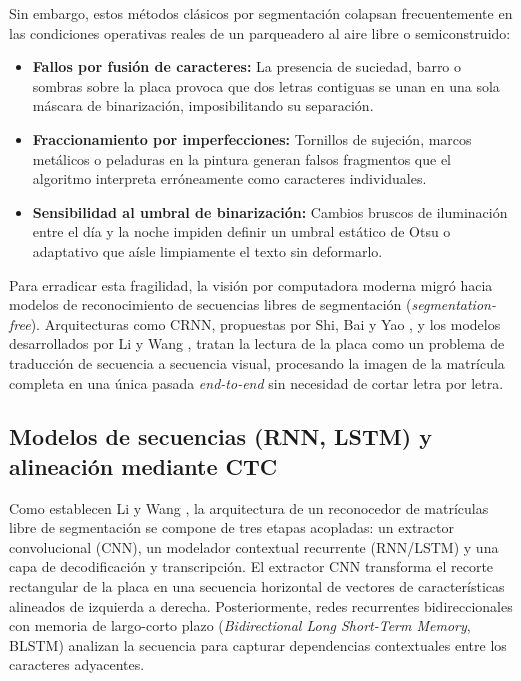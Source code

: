 Sin embargo, estos métodos clásicos por segmentación colapsan frecuentemente en
las condiciones operativas reales de un parqueadero al aire libre o
semiconstruido:
\begin{itemize}
    \item \textbf{Fallos por fusión de caracteres:} La presencia de suciedad,
        barro o sombras sobre la placa provoca que dos letras contiguas se unan
        en una sola máscara de binarización, imposibilitando su separación.
        
    \item \textbf{Fraccionamiento por imperfecciones:} Tornillos de sujeción,
        marcos metálicos o peladuras en la pintura generan falsos fragmentos que
        el algoritmo interpreta erróneamente como caracteres individuales.
        
    \item \textbf{Sensibilidad al umbral de binarización:} Cambios bruscos de
        iluminación entre el día y la noche impiden definir un umbral estático
        de Otsu o adaptativo que aísle limpiamente el texto sin deformarlo.
\end{itemize}

Para erradicar esta fragilidad, la visión por computadora moderna migró hacia
modelos de reconocimiento de secuencias libres de segmentación
(\textit{segmentation-free}). Arquitecturas como CRNN, propuestas por Shi, Bai y
Yao \cite{shi2017crnn}, y los modelos desarrollados por Li y Wang 
\cite{li2018reading}, tratan la lectura de la placa como un problema de
traducción de secuencia a secuencia visual, procesando la imagen de la matrícula
completa en una única pasada \textit{end-to-end} sin necesidad de cortar letra
por letra.

\subsection{Modelos de secuencias (RNN, LSTM) y alineación mediante CTC}

Como establecen Li y Wang \cite{li2018reading}, la arquitectura de un
reconocedor de matrículas libre de segmentación se compone de tres etapas
acopladas: un extractor convolucional (CNN), un modelador contextual recurrente
(RNN/LSTM) y una capa de decodificación y transcripción. El extractor CNN
transforma el recorte rectangular de la placa en una secuencia horizontal de
vectores de características alineados de izquierda a derecha. Posteriormente,
redes recurrentes bidireccionales con memoria de largo-corto plazo
(\textit{Bidirectional Long Short-Term Memory}, BLSTM) \cite{hochreiter1997lstm}
analizan la secuencia para capturar dependencias contextuales entre los
caracteres adyacentes.

